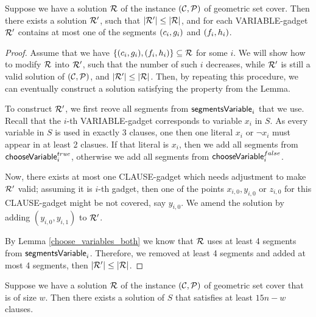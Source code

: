 \begin{lemma}
	\label{at_most_one_var_segment}
	Suppose we have a solution $\mathcal{R}$ of the instance $(\mathcal{C}, \mathcal{P})$
	of geometric set cover.
	Then there exists a solution $\mathcal{R}'$, such that $|\mathcal{R}'| \le |\mathcal{R}|$,
	and for each VARIABLE-gadget $\mathcal{R}'$ contains
	at most one of the segments $(c_{i}, g_{i})$ and $(f_{i}, h_{i})$.
\end{lemma}
\begin{proof}\leavevmode
Assume that we have $\{(c_{i}, g_{i}), (f_{i}, h_{i})\} \subseteq \mathcal{R}$ for some $i$.
We will show how to modify $\mathcal{R}$ into $\mathcal{R}'$,
such that the number of such $i$ decreases,
while $\mathcal{R}'$ is still a valid solution of $(\mathcal{C}, \mathcal{P})$,
and $|\mathcal{R}'| \le |\mathcal{R}|$. Then, by repeating this procedure,
we can eventually construct a solution satisfying the property from the Lemma.

To construct $\mathcal{R}'$, 
we first reove all segments from $\mathsf{segmentsVariable}_{i}$ that we use.
Recall that the $i$-th VARIABLE-gadget corresponds to variable $x_i$ in $S$.
As every variable in $S$ is used in exactly 3 clauses,
one then one literal $x_i$ or $\neg x_i$ must appear in at least
2 clasues.
If that literal is $x_i$, then we add all segments from $\mathsf{chooseVariable}^{true}_{i}$,
otherwise we add all segments from $\mathsf{chooseVariable}^{false}_{i}$.

Now, there exists at most one CLAUSE-gadget which needs adjustment to make $\mathcal{R}'$ valid;
assuming it is $i$-th gadget, then one of the points $x_{i,0}, y_{i,0}$ or $z_{i,0}$ for this
CLAUSE-gadget might be not covered, say $y_{i,0}$.
We amend the solution by adding $(y_{i,0}, y_{i,1})$ to $\mathcal{R}'$.

By Lemma \ref{choose_variables_both} we know 
that $\mathcal{R}$ uses at least 4 segments from $\mathsf{segmentsVariable}_{i}$.
Therefore, we removed at least 4 segments and added at most 4 segments,
then $|\mathcal{R}'| \le |\mathcal{R}|$.
\end{proof}

\begin{lemma}
	\label{construction_completness}
	Suppose we have a solution $\mathcal{R}$ of the instance $(\mathcal{C}, \mathcal{P})$
	of geometric set cover that is of size $w$.
	Then there exists a solution of $S$
	that satisfies at least $15n - w$ clauses.
\end{lemma}



